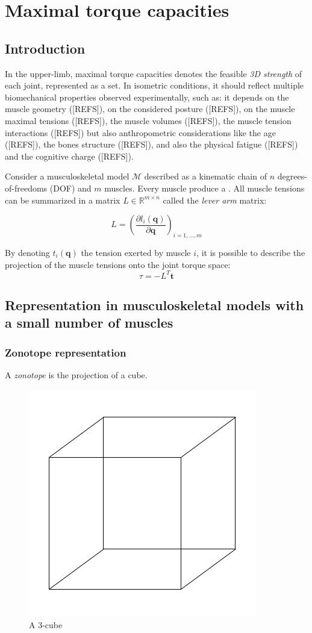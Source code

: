 
\chapter{Maximal torque capacities}
\label{chapter:maximaltorquecapacities}
\section{Introduction}

In the upper-limb, maximal torque capacities denotes the feasible \textit{3D strength} of each joint, represented as a set.
In isometric conditions, it should reflect multiple biomechanical properties observed experimentally, such as:
it depends on the muscle geometry ([REFS]), on the considered posture ([REFS]), 
on the muscle maximal tensions ([REFS]), the muscle volumes ([REFS]), the muscle tension interactions ([REFS]) but also 
anthropometric considerations like the age ([REFS]), the bones structure ([REFS]), and also the physical fatigue ([REFS])
and the cognitive charge ([REFS]).

Consider a musculoskeletal model $\mathcal{M}$ described as a kinematic chain of $n$ degrees-of-freedoms (DOF)
and $m$ muscles. Every muscle produce a . All muscle tensions can be summarized in a matrix $L\in \mathbb{R}^{m\times n}$
called the \textit{lever arm} matrix:

$$L = \left(\frac{\partial l_i(\mathbf{q})}{\partial \mathbf{q}}\right)_{i=1,\dots,m}$$

By denoting $t_i(\mathbf{q})$ the tension exerted by muscle $i$, it is possible to describe the projection of 
the muscle tensions onto the joint torque space:
$$\tau = -L^T\mathbf{t}$$


\section{Representation in musculoskeletal models with a small number of muscles}
\subsection{Zonotope representation}
\begin{definition}
    A \textit{zonotope} is the projection of a cube.
\end{definition}


\begin{figure}[h]
    \centering
    \includegraphics[width=0.3\linewidth]{img/zonotopes/Cube3D.png}
    \caption[A $3$-cube]{A $3$-cube}
    \label{im:3Dcube}
\end{figure}

